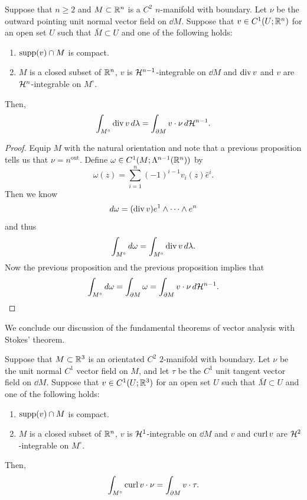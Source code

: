 \documentclass[a4paper]{article}
\begin{document}
\begin{thm}
  Suppose that $n \geq 2$ and $M \subset \mathbb{R}^n$ is a $C^2$
  $n$-manifold with boundary. Let $\nu$ be the outward pointing
  unit normal vector field on $\dd M$. Suppose that
  $v \in C^1(U ; \mathbb{R}^n)$ for an open set $U$ such that
  $\bar{M} \subset U$ and one of the following holds:
  \begin{enumerate}
    \item $\operatorname{supp}(v) \cap M$ is compact.
    \item $M$ is a closed subset of $\mathbb{R}^n$, $v$ is
          $\mathcal{H}^{n-1}$-integrable on $\dd M$ and $\operatorname{div} v$ and $v$
          are $\mathcal{H}^n$-integrable on $M^\circ$.
  \end{enumerate}
  Then,
  \[
    \int_{M^\circ} \operatorname{div} v \, d \lambda = \int_{\partial M}
    v \cdot \nu \, d \mathcal{H}^{n-1}.
  \]
\end{thm}

\begin{proof}
  Equip $M$ with the natural orientation and note that a previous
  proposition tells us that $\nu = n^{\text{out}}$. Define $\omega \in C^1
    (M ; \Lambda^{n-1} (\mathbb{R}^n))$ by
  \[
    \omega(z) = \sum_{i=1}^n (-1)^{i-1} v_i(z) \hat{e}^i.
  \]
  Then we know
  \[
    d \omega = (\operatorname{div} v) e^1 \wedge \dots \wedge e^n
  \]
  and thus
  \[
    \int_{M^\circ} d \omega = \int_{M^\circ} \operatorname{div}
    v \, d \lambda.
  \]
  Now the previous proposition and the previous proposition implies that
  \[
    \int_{M^\circ} d \omega = \int_{\partial M} \omega
    = \int_{\partial M} v \cdot \nu \, d \mathcal{H}^{n-1}.
  \]
\end{proof}

We conclude our discussion of the fundamental theorems of vector analysis
with Stokes' theorem.

\begin{thm}
  Suppose that $M \subset \mathbb{R}^3$ is an orientated $C^2$
  $2$-manifold with boundary. Let $\nu$ be the unit normal
  $C^1$ vector field on $M$, and let $\tau$ be the $C^1$
  unit tangent vector field on $\dd M$. Suppose that
  $v \in C^1(U; \mathbb{R}^3)$ for an open set $U$ such that $\bar{M}
    \subset U$ and one of the following holds:
  \begin{enumerate}
    \item $\operatorname{supp}(v) \cap M$ is compact.
    \item $M$ is a closed subset of $\mathbb{R}^n$, $v$ is $\mathcal{H}^1$-integrable
          on $\dd M$ and $v$ and $\operatorname{curl} v$ are $\mathcal{H}^2$-integrable
          on $M^\circ$.
  \end{enumerate}
  Then,
  \[
    \int_{M^\circ} \operatorname{curl} v \cdot \nu = \int_{\partial M} v \cdot \tau.
  \]
\end{thm}
\end{document}
